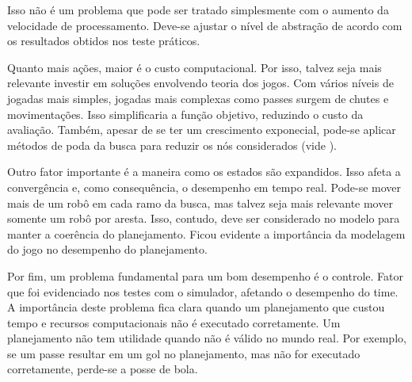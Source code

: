Isso não é um problema que pode ser tratado simplesmente com o aumento da
velocidade de processamento. Deve-se ajustar o nível de abstração de acordo com
os resultados obtidos nos teste práticos.

Quanto mais ações, maior é o custo computacional. Por isso, talvez seja mais
relevante investir em soluções envolvendo teoria dos jogos. Com vários níveis de
jogadas mais simples, jogadas mais complexas como passes surgem de chutes e
movimentações. Isso simplificaria a função objetivo, reduzindo o custo da
avaliação. Também, apesar de se ter um crescimento exponecial, pode-se aplicar
métodos de poda da busca para reduzir os nós considerados (vide
\cite{russell2003artificial}).

Outro fator importante é a maneira como os estados são expandidos. Isso afeta a
convergência e, como consequência, o desempenho em tempo real. Pode-se mover
mais de um robô em cada ramo da busca, mas talvez seja mais relevante mover
somente um robô por aresta. Isso, contudo, deve ser considerado no modelo para
manter a coerência do planejamento.  Ficou evidente a importância da modelagem
do jogo no desempenho do planejamento.

Por fim, um problema fundamental para um bom desempenho é o controle.  Fator que foi
evidenciado nos testes com o simulador, afetando o desempenho do time. A importância
deste problema fica clara quando um planejamento que custou tempo e recursos computacionais
não é executado corretamente. Um planejamento não tem utilidade quando não é válido
no mundo real. Por exemplo, se um passe resultar em um gol no planejamento, mas não
for executado corretamente, perde-se a posse de bola.

